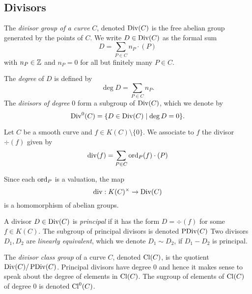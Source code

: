 \subsection{Divisors}

\begin{definition}
	The \emph{divisor group of a curve} $C$, denoted $\operatorname{Div}(C)$ is the free
	abelian group generated by the points of $C$. We write $D \in \operatorname{Div}(C)$ as
	the formal sum
	\begin{equation*}
		D = \sum_{P \in C} n_P\cdot(P)
	\end{equation*}
	with $n_P \in \mathbb{Z}$ and $n_P = 0$ for all but finitely many $P \in C$.

	The \emph{degree} of $D$ is defined by
	\begin{equation*}
		\deg D = \sum_{P \in C} n_P.
	\end{equation*}
	The \emph{divisors of degree} 0 form a subgroup of $\operatorname{Div}(C)$, which we denote
	by
	\begin{equation*}
		\operatorname{Div}^0(C) = \{D \in \operatorname{Div}(C) \mid \deg D = 0\}.
	\end{equation*}
\end{definition}

\begin{definition}
	Let $C$ be a smooth curve and $f \in K(C)\setminus\{0\}$. We
	associate to $f$ the divisor $\div(f)$ given by
	\begin{equation*}
		\operatorname{div}(f) = \sum_{P \in C}\operatorname{ord}_P(f)\cdot(P)
	\end{equation*}
\end{definition}

\begin{remark}
	Since each $\operatorname{ord}_P$ is a valuation, the map
	\begin{equation*}
		\operatorname{div}: K(C)^\times \to \operatorname{Div}(C)
	\end{equation*}
	is a homomorphism of abelian groups.
\end{remark}

\begin{definition}
	A divisor $D \in \operatorname{Div}(C)$ is \emph{principal} if it has the form
	$D = \div(f)$ for some $f \in K(C)$. The subgroup of principal divisors
	is denoted $\operatorname{PDiv}(C)$
	Two divisors $D_1, D_2$ are \emph{linearly equivalent}, which we denote
	$D_1 \sim D_2$, if $D_1 - D_2$ is principal.
\end{definition}

\begin{definition}
	The \emph{divisor class group} of a curve $C$,
	denoted $\operatorname{Cl}(C)$, is the quotient $\operatorname{Div}(C)/\operatorname{PDiv}(C)$.
	Principal divisors have degree $0$ and hence it makes sense to speak about
	the degree of elements in $\operatorname{Cl}(C)$. The sugroup of elements of $\operatorname{Cl}(C)$ of
	degree $0$ is denoted $\operatorname{Cl}^0(C)$.
\end{definition}

